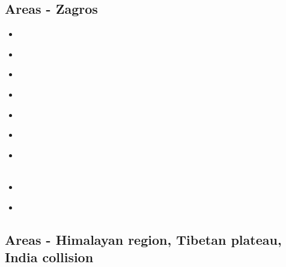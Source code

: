 \subsection{Areas - Zagros} 

\begin{scriptsize}
\begin{itemize}
\item[\nineteenninetyseven]
\textcite{rabh97} \\
\item[\twothousandfive]
\textcite{mozl05} \\
\item[\twothousandsix]
\textcite{vech06} \\
\item[\twothousandten]
\textcite{hamo10} \\
\item[\twothousandeleven]
\textcite{yakm11} \\
\item[\twothousandthirteen]
\textcite{nipc13} \\
\item[\twothousandfourteen]
\textcite{frba14} \\
\textcite{ghbu14} \\
\item[\twothousandsixteen]
\textcite{coyc16} \\
\item[\twothousandseventeen]
\textcite{rugb17} \\
\end{itemize}
\end{scriptsize}

\subsection{Areas - Himalayan region, Tibetan plateau, India collision} 


